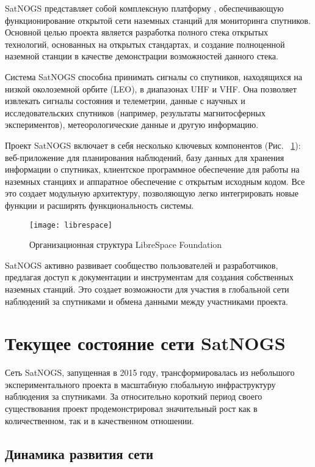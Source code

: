 SatNOGS представляет собой комплексную платформу \cite{satnogs_general_docs},
обеспечивающую функционирование открытой сети наземных станций для мониторинга
спутников. Основной целью проекта является разработка полного стека открытых
технологий, основанных на открытых стандартах, и создание полноценной наземной
станции в качестве демонстрации возможностей данного стека.

Система SatNOGS способна принимать сигналы со спутников, находящихся на низкой
околоземной орбите (LEO), в диапазонах UHF и VHF. Она позволяет извлекать
сигналы состояния и телеметрии, данные с научных и исследовательских спутников
(например, результаты магнитосферных экспериментов), метеорологические данные и
другую информацию.

Проект SatNOGS включает в себя несколько ключевых компонентов (Рис. ~\ref{fig:librespace}): веб-приложение
для планирования наблюдений, базу данных для хранения информации о спутниках,
клиентское программное обеспечение для работы на наземных станциях и аппаратное
обеспечение с открытым исходным кодом. Все это создает модульную архитектуру,
позволяющую легко интегрировать новые функции и расширять функциональность
системы.

\begin{figure}[ht]
	\centering
	\texttt{[image: librespace]}
	\caption{Организационная структура LibreSpace Foundation}
	\label{fig:librespace}
\end{figure}

SatNOGS активно развивает сообщество пользователей и разработчиков, предлагая
доступ к документации и инструментам для создания собственных наземных станций.
Это создает возможности для участия в глобальной сети наблюдений за спутниками
и обмена данными между участниками проекта.

\section{Текущее состояние сети SatNOGS}

Сеть SatNOGS, запущенная в 2015 году, трансформировалась из небольшого
экспериментального проекта в масштабную глобальную инфраструктуру наблюдения за
спутниками. За относительно короткий период своего существования проект
продемонстрировал значительный рост как в количественном, так и в качественном
отношении.

\subsection{Динамика развития сети}

